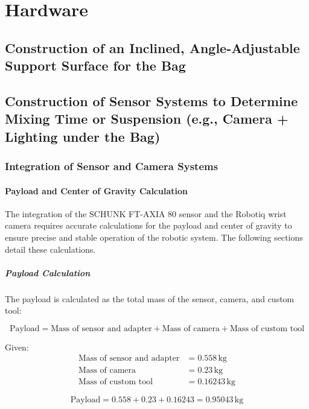 \section{Hardware}
\subsection{Construction of an Inclined, Angle-Adjustable Support Surface for the Bag}
\subsection{Construction of Sensor Systems to Determine Mixing Time or Suspension (e.g., Camera + Lighting under the Bag)}

\subsubsection{Integration of Sensor and Camera Systems}

\paragraph{Payload and Center of Gravity Calculation}

The integration of the SCHUNK FT-AXIA 80 sensor and the Robotiq wrist camera requires accurate calculations for the payload and center of gravity to ensure precise and stable operation of the robotic system. The following sections detail these calculations.

\subparagraph{Payload Calculation}

The payload is calculated as the total mass of the sensor, camera, and custom tool:

\begin{equation}
\text{Payload} = \text{Mass of sensor and adapter} + \text{Mass of camera} + \text{Mass of custom tool}
\end{equation}

Given:
\begin{align*}
\text{Mass of sensor and adapter} &= 0.558 \, \text{kg} \\
\text{Mass of camera} &= 0.23 \, \text{kg} \\
\text{Mass of custom tool} &= 0.16243 \, \text{kg}
\end{align*}

\begin{equation}
\text{Payload} = 0.558 + 0.23 + 0.16243 = 0.95043 \, \text{kg}
\end{equation}

